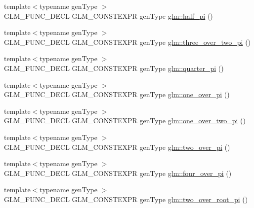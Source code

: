 \begin{DoxyCompactItemize}
\item 
{\footnotesize template$<$typename gen\+Type $>$ }\\G\+L\+M\+\_\+\+F\+U\+N\+C\+\_\+\+D\+E\+CL G\+L\+M\+\_\+\+C\+O\+N\+S\+T\+E\+X\+PR gen\+Type \hyperlink{group__gtc__constants_ga0c36b41d462e45641faf7d7938948bac}{glm\+::half\+\_\+pi} ()
\item 
{\footnotesize template$<$typename gen\+Type $>$ }\\G\+L\+M\+\_\+\+F\+U\+N\+C\+\_\+\+D\+E\+CL G\+L\+M\+\_\+\+C\+O\+N\+S\+T\+E\+X\+PR gen\+Type \hyperlink{group__gtc__constants_gae94950df74b0ce382b1fc1d978ef7394}{glm\+::three\+\_\+over\+\_\+two\+\_\+pi} ()
\item 
{\footnotesize template$<$typename gen\+Type $>$ }\\G\+L\+M\+\_\+\+F\+U\+N\+C\+\_\+\+D\+E\+CL G\+L\+M\+\_\+\+C\+O\+N\+S\+T\+E\+X\+PR gen\+Type \hyperlink{group__gtc__constants_ga3c9df42bd73c519a995c43f0f99e77e0}{glm\+::quarter\+\_\+pi} ()
\item 
{\footnotesize template$<$typename gen\+Type $>$ }\\G\+L\+M\+\_\+\+F\+U\+N\+C\+\_\+\+D\+E\+CL G\+L\+M\+\_\+\+C\+O\+N\+S\+T\+E\+X\+PR gen\+Type \hyperlink{group__gtc__constants_ga555150da2b06d23c8738981d5013e0eb}{glm\+::one\+\_\+over\+\_\+pi} ()
\item 
{\footnotesize template$<$typename gen\+Type $>$ }\\G\+L\+M\+\_\+\+F\+U\+N\+C\+\_\+\+D\+E\+CL G\+L\+M\+\_\+\+C\+O\+N\+S\+T\+E\+X\+PR gen\+Type \hyperlink{group__gtc__constants_ga7c922b427986cbb2e4c6ac69874eefbc}{glm\+::one\+\_\+over\+\_\+two\+\_\+pi} ()
\item 
{\footnotesize template$<$typename gen\+Type $>$ }\\G\+L\+M\+\_\+\+F\+U\+N\+C\+\_\+\+D\+E\+CL G\+L\+M\+\_\+\+C\+O\+N\+S\+T\+E\+X\+PR gen\+Type \hyperlink{group__gtc__constants_ga74eadc8a211253079683219a3ea0462a}{glm\+::two\+\_\+over\+\_\+pi} ()
\item 
{\footnotesize template$<$typename gen\+Type $>$ }\\G\+L\+M\+\_\+\+F\+U\+N\+C\+\_\+\+D\+E\+CL G\+L\+M\+\_\+\+C\+O\+N\+S\+T\+E\+X\+PR gen\+Type \hyperlink{group__gtc__constants_ga753950e5140e4ea6a88e4a18ba61dc09}{glm\+::four\+\_\+over\+\_\+pi} ()
\item 
{\footnotesize template$<$typename gen\+Type $>$ }\\G\+L\+M\+\_\+\+F\+U\+N\+C\+\_\+\+D\+E\+CL G\+L\+M\+\_\+\+C\+O\+N\+S\+T\+E\+X\+PR gen\+Type \hyperlink{group__gtc__constants_ga5827301817640843cf02026a8d493894}{glm\+::two\+\_\+over\+\_\+root\+\_\+pi} ()

\end{DoxyCompactItemize}
